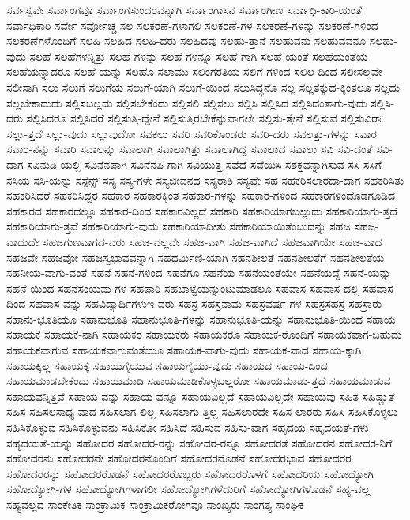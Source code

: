 {ಸರ್ವಸ್ವವೇ
ಸರ್ವಾಂಗವೂ
ಸರ್ವಾಂಗಸುಂದರವನ್ನಾಗಿ
ಸರ್ವಾಂಗಾಸನ
ಸರ್ವಾಂಗೀಣ
ಸರ್ವಾಧಿ-ಕಾರಿ-ಯಂತೆ
ಸರ್ವಾಧಿಕಾರಿ
ಸರ್ವೇ
ಸರ್ವೋಚ್ಚ
ಸಲ
ಸಲಕರಣೆ-ಗಳಾಗಲಿ
ಸಲಕರಣೆ-ಗಳ
ಸಲಕರಣೆ-ಗಳನ್ನು
ಸಲಕರಣೆ-ಗಳಿಂದ
ಸಲಕರಣೆಗಳೊಂದಿಗೆ
ಸಲಹಿ
ಸಲಹಿದ
ಸಲಹಿ-ದರು
ಸಲಹಿದವು
ಸಲಹು-ತ್ತಾನೆ
ಸಲಹುವನು
ಸಲಹುವವನೂ
ಸಲಹು-ವುದು
ಸಲಹೆ
ಸಲಹೆಗಳನ್ನಿತ್ತು
ಸಲಹೆ-ಗಳನ್ನು
ಸಲಹೆ-ಗಳನ್ನೂ
ಸಲಹೆ-ಗಾಗಿ
ಸಲಹೆ-ಯಂತೆ
ಸಲಹೆಯಂತೆಯೆ
ಸಲಹೆಯನ್ನಾದರೂ
ಸಲಹೆ-ಯನ್ನು
ಸಲಹೊ
ಸಲಾಮು
ಸಲಿಂಗರತಿಯ
ಸಲಿಗೆ-ಗಳಿಂದ
ಸಲಿಲ-ದಿಂದ
ಸಲೀಸಲ್ಲವೇ
ಸಲೀಸಾಗಿ
ಸಲು
ಸಲುಗೆ
ಸಲುಗೆಯ
ಸಲುಗೆ-ಯಾಗಿ
ಸಲುಗೆ-ಯಿಂದ
ಸಲುಸಿದ್ಧನೊ
ಸಲ್ಲ
ಸಲ್ಲತಕ್ಕುದ-ಕ್ಕಿಂತಲೂ
ಸಲ್ಲದು
ಸಲ್ಲಬೇಕಾದುದು
ಸಲ್ಲಿಸಬಲ್ಲದು
ಸಲ್ಲಿಸಬೇಕೆಂದು
ಸಲ್ಲಿಸಲಿ
ಸಲ್ಲಿಸಲು
ಸಲ್ಲಿಸಿ
ಸಲ್ಲಿಸಿದ
ಸಲ್ಲಿಸಿದಂತಾಗು-ವುದು
ಸಲ್ಲಿಸಿ-ದರು
ಸಲ್ಲಿಸಿದರೂ
ಸಲ್ಲಿಸಿದರೆ
ಸಲ್ಲಿಸುತ್ತಿ-ದ್ದೇನೆ
ಸಲ್ಲಿಸುತ್ತಿರಬೇಕೆನ್ನುವಾಗಲೇ
ಸಲ್ಲಿಸು-ತ್ತೇನೆ
ಸಲ್ಲಿಸುವ
ಸಲ್ಲಿಸುವಿರಾ
ಸಲ್ಲು-ತ್ತದೆ
ಸಲ್ಲು-ವುದು
ಸಲ್ಲುವುದೋ
ಸವಕಲು
ಸವರಿ
ಸವರಿಕೊಂಡರು
ಸವರಿ-ದರು
ಸವಲತ್ತು-ಗಳನ್ನು
ಸವಾರ
ಸವಾರ-ನನ್ನು
ಸವಾರಿ
ಸವಾಲನ್ನು
ಸವಾಲಾಗಿ
ಸವಾಲಾಗಿತ್ತು
ಸವಾಲಾಗಿದ್ದ
ಸವಾಲಾದ
ಸವಾಲು
ಸವಿ
ಸವಿ-ದಂತೆ
ಸವಿ-ದಾಗ
ಸವಿನುಡಿ-ಯಲ್ಲಿ
ಸವಿನೆನಪಾಗಿ
ಸವಿನೆನಪಿ-ಗಾಗಿ
ಸವಿಯುತ್ತ
ಸವೆದೆ
ಸವೆಯಿಸಿ
ಸಶಕ್ತವನ್ನಾಗಿಸುವ
ಸಸಿ
ಸಸಿಗೆ
ಸಸಿಯ
ಸಸಿ-ಯನ್ನು
ಸಸ್ಪೆನ್ಸ್
ಸಸ್ಯ
ಸಸ್ಯ-ಗಳೇ
ಸಸ್ಯಜೀವನದ
ಸಸ್ಯರಾಶಿ
ಸಸ್ಯವೇ
ಸಹ
ಸಹಕರಿಸಲಾರದಾ-ದಾಗ
ಸಹಕರಿಸಿತು
ಸಹಕರಿಸಿದರೆ
ಸಹಕರಿಸಿದ್ದರ
ಸಹಕಾರ
ಸಹಕಾರಕ್ಕಿಂತ
ಸಹಕಾರ-ಗಳನ್ನು
ಸಹಕಾರ-ಗಳಿಂದ
ಸಹಕಾರಗಳಿಂದೊಡಗೂಡಿದ
ಸಹಕಾರದ
ಸಹಕಾರದಲ್ಲೂ
ಸಹಕಾರ-ದಿಂದ
ಸಹಕಾರವಿಲ್ಲದೆ
ಸಹಕಾರಿ
ಸಹಕಾರಿಯಾಗಬಲ್ಲುದು
ಸಹಕಾರಿಯಾಗು-ತ್ತದೆ
ಸಹಕಾರಿಯಾಗು-ತ್ತವೆ
ಸಹಕಾರಿಯಾಗು-ವುದು
ಸಹಕಾರಿಯಾದೀತು
ಸಹಕಾರಿಯಾಯಿತೆಂಬುದನ್ನು
ಸಹಜ
ಸಹಜ-ವಾದುದೇ
ಸಹಜಗುಣವಾಗದ-ವರು
ಸಹಜ-ವಲ್ಲವೇ
ಸಹಜ-ವಾಗಿ
ಸಹಜ-ವಾಗಿದೆ
ಸಹಜವಾಗಿಯೇ
ಸಹಜ-ವಾದ
ಸಹಜವೇ
ಸಹಜವೋ
ಸಹಜಸ್ವಭಾವವನ್ನಾಗಿ
ಸಹಧರ್ಮಿಣಿ-ಯಾಗಿ
ಸಹನಶೀಲತೆ
ಸಹನಶೀಲತೆಗೆ
ಸಹನಶೀಲತೆಯ
ಸಹನೀಯ-ವಾಗು-ವಂತೆ
ಸಹನೆ
ಸಹನೆ-ಗಳಿಂದ
ಸಹನೆಗೂ
ಸಹನೆಯ
ಸಹನೆಯಂತೆಯೇ
ಸಹನೆಯದ್ದೆ
ಸಹನೆ-ಯನ್ನು
ಸಹನೆ-ಯಿಂದ
ಸಹನೆಸಂಯಮ-ಗಳ
ಸಹಪಾಠಿ
ಸಹಬಾಳ್ವೆಯನ್ನುಂಟುಮಾಡಲೂ
ಸಹವಾಸ
ಸಹವಾಸ-ದಲ್ಲಿ
ಸಹವಾಸ-ದಿಂದ
ಸಹವಾಸ-ವನ್ನು
ಸಹವಿದ್ಯಾರ್ಥಿಗಳುಇ-ವರು
ಸಹಸ್ರ
ಸಹಸ್ರನಾಮ
ಸಹಸ್ರವರ್ಷ-ಗಳ
ಸಹಸ್ರಸಹಸ್ರ
ಸಹಸ್ರಾರು
ಸಹಾನು-ಭೂತಿಯೂ
ಸಹಾನುಭೂತಿ
ಸಹಾನುಭೂತಿ-ಗಳನ್ನು
ಸಹಾನುಭೂತಿ-ಯನ್ನು
ಸಹಾನುಭೂತಿ-ಯಿಂದ
ಸಹಾಯ
ಸಹಾಯಕ
ಸಹಾಯಕ-ನಾಗಿ
ಸಹಾಯಕರ
ಸಹಾಯಕರು
ಸಹಾಯಕರೂ
ಸಹಾಯಕ-ರೊಂದಿಗೆ
ಸಹಾಯಕವಾಗ-ಬಹುದು
ಸಹಾಯಕವಾಗುವ
ಸಹಾಯಕವಾಗುವಂತೆಯೂ
ಸಹಾಯಕ-ವಾಗು-ವುದು
ಸಹಾಯಕ-ವಾದ
ಸಹಾಯ-ಕ್ಕಾಗಿ
ಸಹಾಯಕ್ಕಿಲ್ಲ
ಸಹಾಯಕ್ಕೆ
ಸಹಾಯಗೈಯುವ
ಸಹಾಯಗೈಯು-ವುದು
ಸಹಾಯದ
ಸಹಾಯ-ದಿಂದ
ಸಹಾಯಮಾಡಬೇಕೆಂದು
ಸಹಾಯಮಾಡಿ
ಸಹಾಯಮಾಡಿಕೊಳ್ಳಬಲ್ಲರೋ
ಸಹಾಯಮಾಡು-ತ್ತದೆ
ಸಹಾಯಮಾಡುವ
ಸಹಾಯವನ್ನಿತ್ತಿವೆ
ಸಹಾಯ-ವನ್ನು
ಸಹಾಯ-ವನ್ನೂ
ಸಹಾಯವಿಲ್ಲದೆ
ಸಹಾಯವಿಲ್ಲದೇ
ಸಹಾಯವು
ಸಹಿತ
ಸಹಿಷ್ಣುತೆ
ಸಹಿಸ
ಸಹಿಸಲಸಾಧ್ಯ-ವಾದ
ಸಹಿಸಲಾಗ-ಲಿಲ್ಲ
ಸಹಿಸಲಾಗು-ತ್ತಿಲ್ಲ
ಸಹಿಸಲಾರದೇ
ಸಹಿಸ-ಲಾರರು
ಸಹಿಸಿ
ಸಹಿಸಿಕೊಳ್ಳಲು
ಸಹಿಸಿಕೊಳ್ಳುವ
ಸಹಿಸಿಕೊಳ್ಳುವನು
ಸಹಿಸಿಕೋ
ಸಹಿಸಿದೆ
ಸಹಿಸುವ
ಸಹಿಸು-ವಾಗ
ಸಹೃದಯ
ಸಹೃದಯತೆ-ಗಳು
ಸಹೃದಯತೆ-ಯನ್ನು
ಸಹೋದರ
ಸಹೋದರ-ರನ್ನು
ಸಹೋದರ-ರನ್ನೂ
ಸಹೋದರತೆ
ಸಹೋದರನ
ಸಹೋದರ-ನಿಗೆ
ಸಹೋದರನು
ಸಹೋದರನೇ
ಸಹೋದರನೊಂದಿಗೆ
ಸಹೋದರನೊಡನೆ
ಸಹೋದರಭಾವ
ಸಹೋದರರ
ಸಹೋದರರನ್ನು
ಸಹೋದರರೊಡನೆ
ಸಹೋದರರೊಬ್ಬರು
ಸಹೋದರರೊಳಗೆ
ಸಹೋದರಿಯ
ಸಹೋದ್ಯೋಗಿ
ಸಹೋದ್ಯೋಗಿ-ಗಳ
ಸಹೋದ್ಯೋಗಿಗಳಾಗಲೀ
ಸಹೋದ್ಯೋಗಿಗಳೆದುರಿಗೆ
ಸಹೋದ್ಯೋಗಿಗಳೊಡನೆ
ಸಹ್ಯ-ವಲ್ಲ
ಸಹ್ಯವಲ್ಲದ
ಸಾಂಕೇತಿಕ
ಸಾಂಕ್ರಾಮಿಕ
ಸಾಂಕ್ರಾಮಿಕರೋಗವೂ
ಸಾಂಖ್ಯರು
ಸಾಂಗತ್ಯ
ಸಾಂಘಿಕ
}
